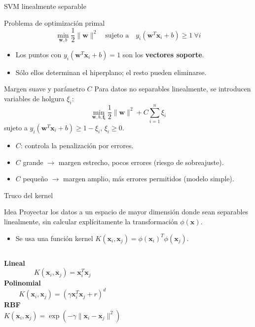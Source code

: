 \documentclass[aspectratio=169, 10pt, xcolor=table]{beamer}
\begin{document}
\begin{frame}{SVM linealmente separable}
    \begin{block}{Problema de optimización primal}
        \[
        \min_{\mathbf{w},b} \frac{1}{2}\|\mathbf{w}\|^2 \quad \text{sujeto a} \quad y_i(\mathbf{w}^T\mathbf{x}_i + b) \ge 1 \ \forall i
        \]
    \end{block}
    \begin{itemize}
        \item Los puntos con $y_i(\mathbf{w}^T\mathbf{x}_i + b) = 1$ son los \textbf{vectores soporte}.
        \item Sólo ellos determinan el hiperplano; el resto pueden eliminarse.
    \end{itemize}
\end{frame}

\begin{frame}{Margen suave y parámetro $C$}
    Para datos no separables linealmente, se introducen variables de holgura $\xi_i$:
    \[
    \min_{\mathbf{w},b,\boldsymbol{\xi}} \frac{1}{2}\|\mathbf{w}\|^2 + C\sum_{i=1}^n \xi_i
    \]
    sujeto a $y_i(\mathbf{w}^T\mathbf{x}_i + b) \ge 1 - \xi_i$, $\xi_i \ge 0$.
    \begin{itemize}
        \item $C$: controla la penalización por errores.
        \item $C$ grande $\rightarrow$ margen estrecho, pocos errores (riesgo de sobreajuste).
        \item $C$ pequeño $\rightarrow$ margen amplio, más errores permitidos (modelo simple).
    \end{itemize}
\end{frame}

\begin{frame}{Truco del kernel}
    \begin{block}{Idea}
        Proyectar los datos a un espacio de mayor dimensión donde sean separables linealmente, sin calcular explícitamente la transformación $\phi(\mathbf{x})$.
    \end{block}
    \begin{itemize}
        \item Se usa una función kernel $K(\mathbf{x}_i, \mathbf{x}_j) = \phi(\mathbf{x}_i)^T \phi(\mathbf{x}_j)$.
    \end{itemize}
    \begin{columns}[t]
        \textbf{Lineal}
        \[
        K(\mathbf{x}_i,\mathbf{x}_j) = \mathbf{x}_i^T \mathbf{x}_j
        \]
        \textbf{Polinomial}
        \[
        K(\mathbf{x}_i,\mathbf{x}_j) = (\gamma \mathbf{x}_i^T \mathbf{x}_j + r)^d
        \]
        \textbf{RBF}
        \[
        K(\mathbf{x}_i,\mathbf{x}_j) = \exp(-\gamma \|\mathbf{x}_i - \mathbf{x}_j\|^2)
        \]
    \end{columns}
\end{frame}
\end{document}
